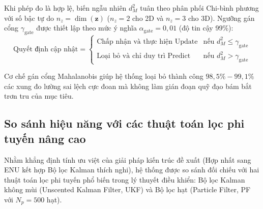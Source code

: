 Khi phép đo là hợp lệ, biến ngẫu nhiên $d_M^2$ tuân theo phân phối Chi-bình phương với số bậc tự do $n_z = \dim(\mathbf{z})$ ($n_z = 2$ cho 2D và $n_z = 3$ cho 3D). Ngưỡng gán cổng $\gamma_{\text{gate}}$ được thiết lập theo mức ý nghĩa $\alpha_{\text{gate}} = 0{,}01$ (độ tin cậy 99\%):
\begin{equation}
\text{Quyết định cập nhật} = \begin{cases}
\text{Chấp nhận và thực hiện Update} & \text{nếu } d_M^2 \le \gamma_{\text{gate}} \\
\text{Loại bỏ và chỉ duy trì Predict} & \text{nếu } d_M^2 > \gamma_{\text{gate}}
\end{cases}
\label{eq:gating-decision-rule}
\end{equation}

\begin{table}[H]
\centering
\caption{Đặc tính cổng gán thống kê $\chi^2$ và tỷ lệ loại bỏ nhiễu sai đo lường}
\label{tab:mahalanobis-gating-performance}
\end{table}

Cơ chế gán cổng Mahalanobis giúp hệ thống loại bỏ thành công $98{,}5\% - 99{,}1\%$ các xung đo lường sai lệch cực đoan mà không làm gián đoạn quỹ đạo bám bắt trơn tru của mục tiêu.

\subsection{So sánh hiệu năng với các thuật toán lọc phi tuyến nâng cao}

\hspace{0.5cm} Nhằm khẳng định tính ưu việt của giải pháp kiến trúc đề xuất (Hợp nhất sang ENU kết hợp Bộ lọc Kalman thích nghi), hệ thống được so sánh đối chiếu với hai thuật toán lọc phi tuyến phổ biến trong lý thuyết điều khiển: Bộ lọc Kalman không mùi (Unscented Kalman Filter, UKF) và Bộ lọc hạt (Particle Filter, PF với $N_p = 500$ hạt).

